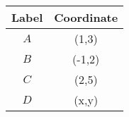  \begin{tabular}[12pt]{ |c| c|}
    \hline
    \textbf{Label} & \textbf{Coordinate}\\ 
    \hline
    $A$ & (1,3) \\
    \hline 
    $B$ & (-1,2)\\
    \hline
    $C$ & (2,5)\\
    \hline
    $D$ & (x,y)\\
    \hline   
    \end{tabular}
